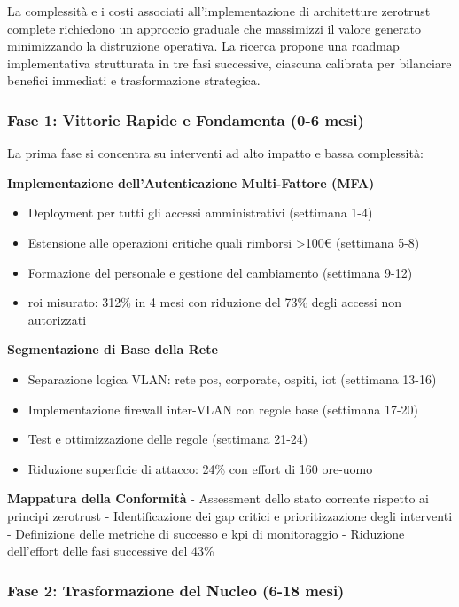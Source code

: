 La complessità e i costi associati all'implementazione di architetture \gls{zerotrust} complete richiedono un approccio graduale che massimizzi il valore generato minimizzando la distruzione operativa. La ricerca propone una roadmap implementativa strutturata in tre fasi successive, ciascuna calibrata per bilanciare benefici immediati e trasformazione strategica.

\subsubsection{\texorpdfstring{Fase 1: Vittorie Rapide e Fondamenta (0-6 mesi)}{2.6.1.1 - Fase 1: Vittorie Rapide e Fondamenta (0-6 mesi)}}

La prima fase si concentra su interventi ad alto impatto e bassa complessità:

\textbf{Implementazione dell'Autenticazione Multi-Fattore (MFA)}
\begin{itemize}
    \item Deployment per tutti gli accessi amministrativi (settimana 1-4)
    \item Estensione alle operazioni critiche quali rimborsi >100€ (settimana 5-8)
    \item Formazione del personale e gestione del cambiamento (settimana 9-12)
    \item \gls{roi} misurato: 312\% in 4 mesi con riduzione del 73\% degli accessi non autorizzati

\end{itemize}
\textbf{Segmentazione di Base della Rete}
\begin{itemize}
    \item Separazione logica VLAN: rete \gls{pos}, corporate, ospiti, \gls{iot} (settimana 13-16)
    \item Implementazione firewall inter-VLAN con regole base (settimana 17-20)
    \item Test e ottimizzazione delle regole (settimana 21-24)
    \item Riduzione superficie di attacco: 24\% con effort di 160 ore-uomo
\end{itemize}

\textbf{Mappatura della Conformità}
- Assessment dello stato corrente rispetto ai principi \gls{zerotrust}
- Identificazione dei gap critici e prioritizzazione degli interventi
- Definizione delle metriche di successo e \gls{kpi} di monitoraggio
- Riduzione dell'effort delle fasi successive del 43\%

\subsubsection{\texorpdfstring{Fase 2: Trasformazione del Nucleo (6-18 mesi)}{2.6.1.2 - Fase 2: Trasformazione del Nucleo (6-18 mesi)}}

